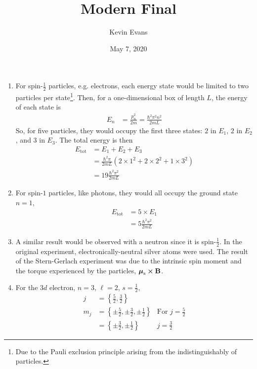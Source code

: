 \documentclass{homework}
\title{Modern Final}
\author{Kevin Evans}
\date{May 7, 2020}
\newcommand{\1}{\mathds{1}}
\begin{document}
	\maketitle
	\begin{enumerate}[label={\arabic*.}]
		\item For spin-$\frac{1}{2}$ particles, e.g. electrons, each energy state would be limited to two particles per state\footnote{Due to the Pauli exclusion principle arising from the indistinguishably of particles.}. Then, for a one-dimensional box of length $L$, the energy of each state is \begin{align*}
			E_n & = \frac{p_n^2}{2m} = \frac{\hbar^2 \pi^2 n^2}{2 m L}
		\end{align*}
		So, for five particles, they would occupy the first three states: $2$ in $E_1$, $2$ in $E_2$, and $3$ in $E_3$. The total energy is then \begin{align*}
			E_\mathrm{tot} & = E_1 + E_2 + E_3 \\
				& = \frac{\hbar^2 \pi}{2 mL} \left(2 \times 1^2 + 2 \times 2^2 + 1 \times 3^2\right) \\
				& = 19 \frac{\hbar^2 \pi^2}{2 mL}
		\end{align*}
	
		\item For spin-$1$ particles, like photons, they would all occupy the ground state $n=1$, \begin{align*}
			E_\mathrm{tot} & = 5 \times E_1 \\
				& = 5 \frac{\hbar^2 \pi^2}{2 mL}
		\end{align*}
	
		\item A similar result would be observed with a neutron since it is spin-$\frac{1}{2}$. In the original experiment, electronically-neutral silver atoms were used. The result of the Stern-Gerlach experiment was due to the intrinsic spin moment and the torque experienced by the particles, $\boldsymbol{\mathrm{\mu}}_\mathrm{s} \cross \boldsymbol{\mathrm{B}}$.
		
		\item For the $3d$ electron, $n=3$, $\ell=2$, $s = \frac{1}{2}$, \begin{align*}
			j & = \left\{ \frac{5}{2}, \frac{3}{2} \right\} \\
			m_j & = \left\{ \pm \frac{5}{2}, \pm \frac{3}{2}, \pm \frac{1}{2} \right\} & \text{For } j = \frac{5}{2} \\
				& = \left\{ \pm \frac{3}{2}, \pm \frac{1}{2}\right\} & j = \frac{3}{2}
		\end{align*}
		

\end{enumerate}
\end{document}
